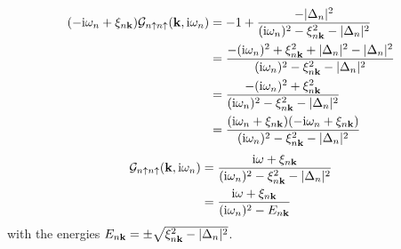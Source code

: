 \begin{align}
    (-\mathrm{i} \omega_n + \xi_{n \bm{\mathrm{k}}}) \mathcal{G}_{n \uparrow n \uparrow} (\bm{\mathrm{k}}, \mathrm{i} \omega_n) &= -1 + \frac{-\vert\Delta_{n}\vert^2}{(\mathrm{i} \omega_n)^2 - \xi_{n \bm{\mathrm{k}}}^2 - \vert\Delta_{n}\vert^2} \\
    &= \frac{-(\mathrm{i} \omega_n)^2 + \xi_{n \bm{\mathrm{k}}}^2 + \vert\Delta_{n}\vert^2 -\vert\Delta_{n}\vert^2}{(\mathrm{i} \omega_n)^2 - \xi_{n \bm{\mathrm{k}}}^2 - \vert\Delta_{n}\vert^2} \\
    &= \frac{-(\mathrm{i} \omega_n)^2 + \xi_{n \bm{\mathrm{k}}}^2}{(\mathrm{i} \omega_n)^2 - \xi_{n \bm{\mathrm{k}}}^2 - \vert\Delta_{n}\vert^2} \\
    &= \frac{(\mathrm{i} \omega_n + \xi_{n \bm{\mathrm{k}}})(-\mathrm{i} \omega_n + \xi_{n \bm{\mathrm{k}}})}{(\mathrm{i} \omega_n)^2 - \xi_{n \bm{\mathrm{k}}}^2 - \vert\Delta_{n}\vert^2}
\end{align}
\begin{align}
    \mathcal{G}_{n \uparrow n \uparrow} (\bm{\mathrm{k}}, \mathrm{i} \omega_n) &= \frac{\mathrm{i} \omega + \xi_{n \bm{\mathrm{k}}}}{(\mathrm{i} \omega_n)^2 - \xi_{n \bm{\mathrm{k}}}^2 - \vert\Delta_{n}\vert^2} \\
    &= \frac{\mathrm{i} \omega + \xi_{n \bm{\mathrm{k}}}}{(\mathrm{i} \omega_n)^2 - E_{n \bm{\mathrm{k}}}}
\end{align}
with the energies \(E_{n \bm{\mathrm{k}}} = \pm \sqrt{\xi_{n \bm{\mathrm{k}}}^2 - \vert\Delta_{n}\vert^2}\).

